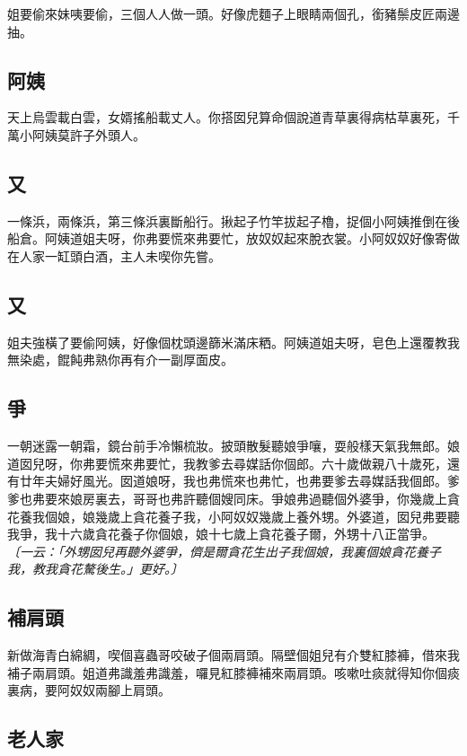 姐要偷來妹咦要偷，三個人人做一頭。好像虎麵子上眼睛兩個孔，銜豬鬃皮匠兩邊抽。

\subsection*{阿姨}

天上烏雲載白雲，女婿搖船載丈人。你搭囡兒算命個說道青草裏得病枯草裏死，千萬小阿姨莫許子外頭人。

\subsection*{又}

一條浜，兩條浜，第三條浜裏斷船行。揪起子竹竿拔起子櫓，捉個小阿姨推倒在後船倉。阿姨道姐夫呀，你弗要慌來弗要忙，放奴奴起來脫衣裳。小阿奴奴好像寄做在人家一缸頭白酒，主人未喫你先嘗。

\subsection*{又}

姐夫強橫了要偷阿姨，好像個枕頭邊篩米滿床粞。阿姨道姐夫呀，皂色上還覆教我無染處，餛飩弗熟你再有介一副厚面皮。

\subsection*{爭}

一朝迷露一朝霜，鏡台前手冷懶梳妝。披頭散髮聽娘爭嚷，耍般樣天氣我無郎。娘道囡兒呀，你弗要慌來弗要忙，我教爹去尋媒話你個郎。六十歲做親八十歲死，還有廿年夫婦好風光。囡道娘呀，我也弗慌來也弗忙，也弗要爹去尋媒話我個郎。爹爹也弗要來娘房裏去，哥哥也弗許聽個嫂同床。爭娘弗過聽個外婆爭，你幾歲上貪花養我個娘，娘幾歲上貪花養子我，小阿奴奴幾歲上養外甥。外婆道，囡兒弗要聽我爭，我十六歲貪花養子你個娘，娘十七歲上貪花養子爾，外甥十八正當爭。
\textit{〔一云：「外甥囡兒再聽外婆爭，儕是爾貪花生出子我個娘，我裏個娘貪花養子我，教我貪花驁後生。」更好。〕}

\subsection*{補肩頭}

新做海青白綿綢，喫個喜蟲哥咬破子個兩肩頭。隔壁個姐兒有介雙紅膝褲，借來我補子兩肩頭。姐道弗識羞弗識羞，囉見紅膝褲補來兩肩頭。咳嗽吐痰就得知你個痰裏病，要阿奴奴兩腳上肩頭。

\subsection*{老人家}

